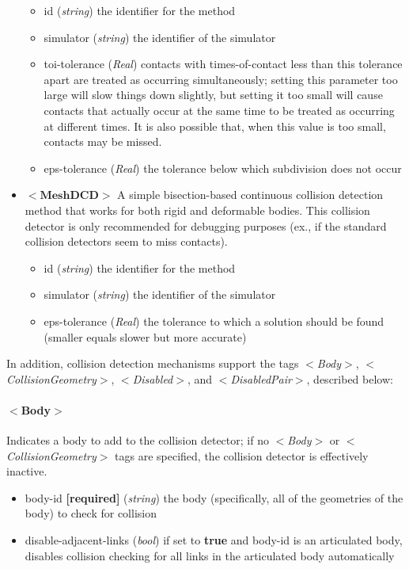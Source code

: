 \documentclass{article}
\begin{document}
\begin{landscape}
\begin{itemize}
\begin{itemize}
\item id  (\emph{string}) the identifier for the method
\item simulator  (\emph{string}) the identifier of the simulator 
\item toi-tolerance  (\emph{Real})  contacts with times-of-contact less than this tolerance apart are treated as occurring simultaneously; setting this parameter too large will slow things down slightly, but setting it too small will cause contacts that actually occur at the same time to be treated as occurring at different times.  It is also possible that, when this value is too small, contacts may be missed.
\item eps-tolerance  (\emph{Real}) the tolerance below which subdivision does not occur
\end{itemize} 
\item $<\textbf{MeshDCD}>$ A simple bisection-based continuous collision detection method that works for both rigid and deformable bodies. This collision detector is only recommended for debugging purposes (ex., if the standard collision detectors seem to miss contacts).
\begin{itemize}
\item id  (\emph{string}) the identifier for the method
\item simulator  (\emph{string}) the identifier of the simulator 
\item eps-tolerance  (\emph{Real}) the tolerance to which a solution should be found (smaller equals slower but more accurate) 
\end{itemize} 
\end{itemize} 


In addition, collision detection mechanisms support the tags $<$\emph{Body}$>$, $<$\emph{CollisionGeometry}$>$, $<$\emph{Disabled}$>$, and $<$\emph{DisabledPair}$>$, described below:

\paragraph{$<$Body$>$}
Indicates a body to add to the collision detector; if no $<$\emph{Body}$>$ or $<$\emph{CollisionGeometry}$>$ tags are specified, the collision detector is effectively inactive.
\begin{itemize}
\item body-id  \textbf{[required]}  (\emph{string})  the body (specifically, all of the geometries of the body) to check for collision
\item disable-adjacent-links  (\emph{bool})  if set to \textbf{true} and body-id is an articulated body, disables collision checking for all links in the articulated body automatically
\end{itemize}


\end{landscape}
\end{document}
